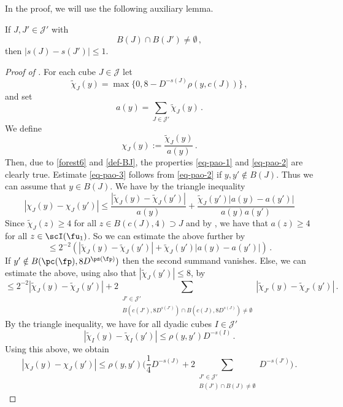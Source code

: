     In the proof, we will use the following auxiliary lemma.

    \begin{lemma}
        \label{moderate-scale-change}

        If $J, J' \in \mathcal{J'}$ with
        $$
            B(J) \cap B(J') \ne \emptyset\,,
        $$
        then $|s(J) - s(J')| \le 1$.
    \end{lemma}

    \begin{proof}[Proof of ]
        For each cube $J \in \mathcal{J}$ let
        $$
            \tilde\chi_J(y) = \max\{0, 8 - D^{-s(J)} \rho(y, c(J))\}\,,
        $$
        and set
        $$
            a(y) = \sum_{J \in \mathcal{J}'} \tilde \chi_J(y)\,.
        $$
        We define
        \[
            \chi_J(y) := \frac{\tilde \chi_J(y)}{a(y)}\,.
        \]
        Then, due to \eqref{forest6} and \eqref{def-BJ}, the properties \eqref{eq-pao-1} and \eqref{eq-pao-2} are clearly true. Estimate \eqref{eq-pao-3} follows from \eqref{eq-pao-2} if $y, y' \notin B(J)$. Thus we can assume that $y \in B(J)$. We have by the triangle inequality
        $$
            |\chi_J(y) - \chi_J(y')| \le \frac{|\tilde \chi_J(y) - \tilde \chi_J(y')|}{a(y)} + \frac{\tilde \chi_J(y')|a(y) - a(y')|}{a(y)a(y')}
        $$
        Since $\tilde \chi_J(z) \ge 4$ for all $z \in B(c(J), 4) \supset J$ and by , we have that $a(z) \ge 4$ for all $z \in \scI(\fu_1)$. So we can estimate the above further by
        $$
            \le 2^{-2}(|\tilde \chi_J(y) - \tilde \chi_J(y')| + \tilde \chi_J(y')|a(y) - a(y')|)\,.
        $$
        If $y' \notin B(\pc(\fp), 8D^{\ps(\fp)})$ then the second summand vanishes. Else, we can estimate the above, using also that $|\tilde \chi_J(y')| \le 8$, by
        $$
            \le 2^{-2} |\tilde \chi_J(y) - \tilde \chi_J(y')| + 2 \sum_{\substack{J' \in \mathcal{J}'\\ B(c(J'), 8D^{s(J')}) \cap B(c(J), 8D^{s(J)}) \ne \emptyset}}|\tilde \chi_{J'}(y) - \tilde \chi_{J'} (y')|\,.
        $$
        By the triangle inequality, we have for all dyadic cubes $I \in \mathcal{J}'$
        $$
            |\tilde \chi_I(y) - \tilde \chi_I(y')| \le \rho(y, y') D^{-s(I)}\,.
        $$
        Using this above, we obtain
        $$
            |\chi_J(y) - \chi_J(y')| \le \rho(y,y') \Big( \frac{1}{4} D^{-s(J)} + 2 \sum_{\substack{J' \in \mathcal{J}'\\ B(J') \cap B(J) \ne \emptyset}} D^{-s(J')}\Big)\,.
$$
\end{proof}
